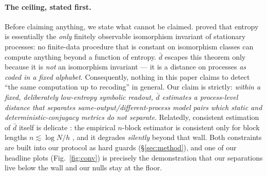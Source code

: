 \documentclass[11pt]{article}
\newcommand{\dbar}{\bar d}
\begin{document}
\paragraph{The ceiling, stated first.} Before claiming anything, we state what cannot
be claimed. \citet{ornstein2007entropy} proved that entropy is essentially the
\emph{only} finitely observable isomorphism invariant of stationary processes: no
finite-data procedure that is constant on isomorphism classes can compute anything
beyond a function of entropy. $\dbar$ escapes this theorem only because it is
\emph{not} an isomorphism invariant --- it is a distance on processes \emph{as coded
in a fixed alphabet}. Consequently, nothing in this paper claims to detect ``the same
computation up to recoding'' in general. Our claim is strictly: \emph{within a fixed,
deliberately low-entropy symbolic readout, $\dbar$ estimates a process-level distance
that separates same-output/different-process model pairs which static and
deterministic-conjugacy metrics do not separate}. Relatedly, consistent estimation of
$\dbar$ itself is delicate \citep{ryabko2019asymptotic}: the empirical $n$-block
estimator is consistent only for block lengths $n \lesssim \log N/h$
\citep{marton1994entropy}, and it degrades \emph{silently} beyond that wall. Both
constraints are built into our protocol as hard guards (\S\ref{sec:method}), and one
of our headline plots (Fig.~\ref{fig:conv}) is precisely the demonstration that our
separations live below the wall and our nulls stay at the floor.
\end{document}
